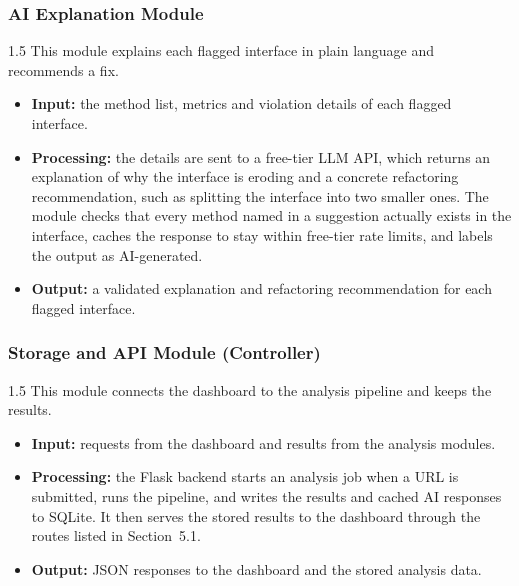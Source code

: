 \documentclass[12pt,a4paper]{article}
\begin{document}
\subsubsection{AI Explanation Module}
 
\begin{spacing}{1.5}
\justifying
This module explains each flagged interface in plain language and recommends a fix.
 
\begin{itemize}[leftmargin=*,itemsep=2pt]
  \item \textbf{Input:} the method list, metrics and violation details of each flagged interface.
  \item \textbf{Processing:} the details are sent to a free-tier LLM API, which returns an explanation of why the interface is eroding and a concrete refactoring recommendation, such as splitting the interface into two smaller ones. The module checks that every method named in a suggestion actually exists in the interface, caches the response to stay within free-tier rate limits, and labels the output as AI-generated.
  \item \textbf{Output:} a validated explanation and refactoring recommendation for each flagged interface.
\end{itemize}
\end{spacing}
 
\subsubsection{Storage and API Module (Controller)}
 
\begin{spacing}{1.5}
\justifying
This module connects the dashboard to the analysis pipeline and keeps the results.
 
\begin{itemize}[leftmargin=*,itemsep=2pt]
  \item \textbf{Input:} requests from the dashboard and results from the analysis modules.
  \item \textbf{Processing:} the Flask backend starts an analysis job when a URL is submitted, runs the pipeline, and writes the results and cached AI responses to SQLite. It then serves the stored results to the dashboard through the routes listed in Section~5.1.
  \item \textbf{Output:} JSON responses to the dashboard and the stored analysis data.
\end{itemize}
\end{spacing}
 
\end{document}
